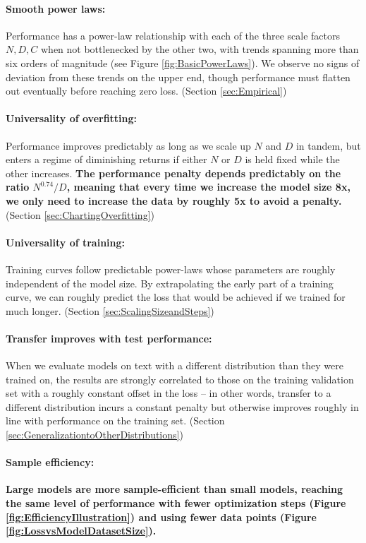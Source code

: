 \documentclass[english]{article}
\begin{document}
\paragraph{Smooth power laws:} Performance has a power-law relationship with each of the three scale factors $N, D, C$ when not bottlenecked by the other two, with trends spanning more than six orders of magnitude (see Figure \ref{fig:BasicPowerLaws}). We observe no signs of deviation from these trends on the upper end, though performance must flatten out eventually before reaching zero loss. (Section \ref{sec:Empirical})

\paragraph{Universality of overfitting:} Performance improves predictably as long as we scale up $N$ and $D$ in tandem, but enters a regime of diminishing returns if either $N$ or $D$ is held fixed while the other increases.  \textbf{The performance penalty depends predictably on the ratio $N^{0.74}/D$, meaning that every time we increase the model size 8x, we only need to increase the data by roughly 5x to avoid a penalty.} (Section \ref{sec:ChartingOverfitting})

\paragraph{Universality of training:} Training curves follow predictable power-laws whose parameters are roughly independent of the model size.  By extrapolating the early part of a training curve, we can roughly predict the loss that would be achieved if we trained for much longer. (Section \ref{sec:ScalingSizeandSteps})

\paragraph{Transfer improves with test performance:} When we evaluate models on text with a different distribution than they were trained on, the results are strongly correlated to those on the training validation set with a roughly constant offset in the loss -- in other words, transfer to a different distribution incurs a constant penalty but otherwise improves roughly in line with performance on the training set. (Section \ref{sec:GeneralizationtoOtherDistributions})

\paragraph{Sample efficiency:} \textbf{Large models are  more sample-efficient than small models, reaching the same level of performance with fewer optimization steps (Figure \ref{fig:EfficiencyIllustration}) and using  fewer data points (Figure \ref{fig:LossvsModelDatasetSize}).}
\end{document}
